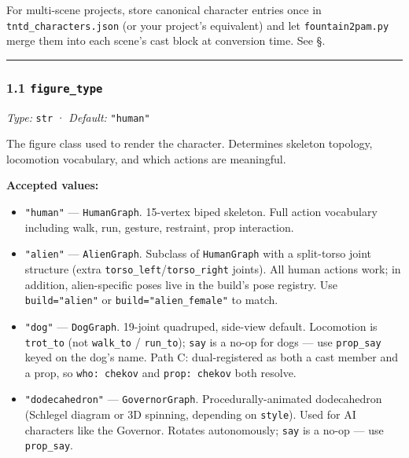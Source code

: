 \documentclass[
  12pt,
  letterpaper,
]{book}
\providecommand{\tightlist}{%
  \setlength{\itemsep}{0pt}\setlength{\parskip}{0pt}}
\begin{document}
For multi-scene projects, store canonical character entries once in
\texttt{tntd\_characters.json} (or your project's equivalent) and let
\texttt{fountain2pam.py} merge them into each scene's cast block at
conversion time. See
\S \cite{field-precedence-and-the-canonical-registry}.%

\begin{center}\rule{0.5\linewidth}{0.5pt}\end{center}

\subsubsection{\texorpdfstring{1.1
\texttt{figure\_type}}{1.1 figure\_type}}\label{figure_type}

\emph{Type:} \texttt{str} · \emph{Default:} \texttt{"human"}

The figure class used to render the character. Determines skeleton
topology, locomotion vocabulary, and which actions are meaningful.

\textbf{Accepted values:}

\begin{itemize}
\tightlist
\item
  \texttt{"human"} --- \texttt{HumanGraph}. 15-vertex biped skeleton.
  Full action vocabulary including walk, run, gesture, restraint, prop
  interaction.
\item
  \texttt{"alien"} --- \texttt{AlienGraph}. Subclass of
  \texttt{HumanGraph} with a split-torso joint structure (extra
  \texttt{torso\_left}/\texttt{torso\_right} joints). All human actions
  work; in addition, alien-specific poses live in the build's pose
  registry. Use \texttt{build="alien"} or \texttt{build="alien\_female"}
  to match.
\item
  \texttt{"dog"} --- \texttt{DogGraph}. 19-joint quadruped, side-view
  default. Locomotion is \texttt{trot\_to} (not \texttt{walk\_to} /
  \texttt{run\_to}); \texttt{say} is a no-op for dogs --- use
  \texttt{prop\_say} keyed on the dog's name. Path C: dual-registered as
  both a cast member and a prop, so \texttt{who:\ chekov} and
  \texttt{prop:\ chekov} both resolve.
\item
  \texttt{"dodecahedron"} --- \texttt{GovernorGraph}.
  Procedurally-animated dodecahedron (Schlegel diagram or 3D spinning,
  depending on \texttt{style}). Used for AI characters like the
  Governor. Rotates autonomously; \texttt{say} is a no-op --- use
  \texttt{prop\_say}.
\end{itemize}
\end{document}
